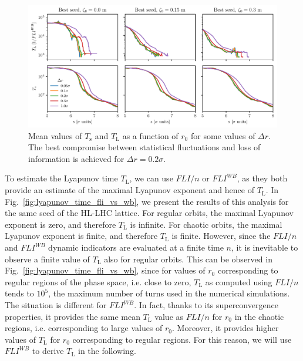 \begin{figure}
    \centering
    \includegraphics[width=1\textwidth]{6_lhc_dynamic_indicators/figs/lyapunov_time_vs_thickness.pdf}
    \caption{Mean values of $T_\mathrm{s}$ and $T_\mathrm{L}$ as a function of $r_0$ for some values of $\Delta r$. The best compromise between statistical fluctuations and loss of information is achieved for $\Delta r = 0.2\sigma$.}
    \label{fig:ts_vs_r0}
\end{figure}

To estimate the Lyapunov time $T_\mathrm{L}$, we can use $FLI/n$ or $FLI^{{WB}}$, as they both provide an estimate of the maximal Lyapunov exponent and hence of $T_\mathrm{L}$. In Fig.~\ref{fig:lyapunov_time_fli_vs_wb}, we present the results of this analysis for the same seed of the HL-LHC lattice. For regular orbits, the maximal Lyapunov exponent is zero, and therefore $T_\mathrm{L}$ is infinite. For chaotic orbits, the maximal Lyapunov exponent is finite, and therefore $T_\mathrm{L}$ is finite. However, since the $FLI/n$ and $FLI^{WB}$ dynamic indicators are evaluated at a finite time $n$, it is inevitable to observe a finite value of $T_\mathrm{L}$ also for regular orbits. This can be observed in Fig.~\ref{fig:lyapunov_time_fli_vs_wb}, since for values of $r_0$ corresponding to regular regions of the phase space, i.e. close to zero, $T_\mathrm{L}$ as computed using $FLI/n$ tends to $10^5$, the maximum number of turns used in the numerical simulations. The situation is different for $FLI^{{WB}}$. In fact, thanks to its superconvergence properties, it provides the same mean $T_\mathrm{L}$ value as $FLI/n$ for $r_0$ in the chaotic regions, i.e. corresponding to large values of $r_0$. Moreover, it provides higher values of $T_\mathrm{L}$ for $r_0$ corresponding to regular regions. For this reason, we will use $FLI^{{WB}}$ to derive $T_\mathrm{L}$ in the following.

